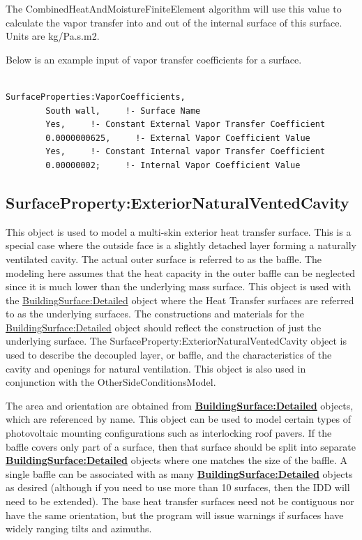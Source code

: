 The CombinedHeatAndMoistureFiniteElement algorithm will use this value to calculate the vapor transfer into and out of the internal surface of this surface. Units are kg/Pa.s.m2.

Below is an example input of vapor transfer coefficients for a surface.

\begin{lstlisting}

SurfaceProperties:VaporCoefficients,
        South wall,     !- Surface Name
        Yes,     !- Constant External Vapor Transfer Coefficient
        0.0000000625,     !- External Vapor Coefficient Value
        Yes,     !- Constant Internal vapor Transfer Coefficient
        0.00000002;     !- Internal Vapor Coefficient Value
\end{lstlisting}

\subsection{SurfaceProperty:ExteriorNaturalVentedCavity}\label{surfacepropertyexteriornaturalventedcavity}

This object is used to model a multi-skin exterior heat transfer surface. This is a special case where the outside face is a slightly detached layer forming a naturally ventilated cavity. The actual outer surface is referred to as the baffle. The modeling here assumes that the heat capacity in the outer baffle can be neglected since it is much lower than the underlying mass surface. This object is used with the \hyperref[buildingsurfacedetailed]{BuildingSurface:Detailed} object where the Heat Transfer surfaces are referred to as the underlying surfaces. The constructions and materials for the \hyperref[buildingsurfacedetailed]{BuildingSurface:Detailed} object should reflect the construction of just the underlying surface. The SurfaceProperty:ExteriorNaturalVentedCavity object is used to describe the decoupled layer, or baffle, and the characteristics of the cavity and openings for natural ventilation. This object is also used in conjunction with the OtherSideConditionsModel.

The area and orientation are obtained from \textbf{\hyperref[buildingsurfacedetailed]{BuildingSurface:Detailed}} objects, which are referenced by name. This object can be used to model certain types of photovoltaic mounting configurations such as interlocking roof pavers. If the baffle covers only part of a surface, then that surface should be split into separate \textbf{\hyperref[buildingsurfacedetailed]{BuildingSurface:Detailed}} objects where one matches the size of the baffle. A single baffle can be associated with as many \textbf{\hyperref[buildingsurfacedetailed]{BuildingSurface:Detailed}} objects as desired (although if you need to use more than 10 surfaces, then the IDD will need to be extended). The base heat transfer surfaces need not be contiguous nor have the same orientation, but the program will issue warnings if surfaces have widely ranging tilts and azimuths.

